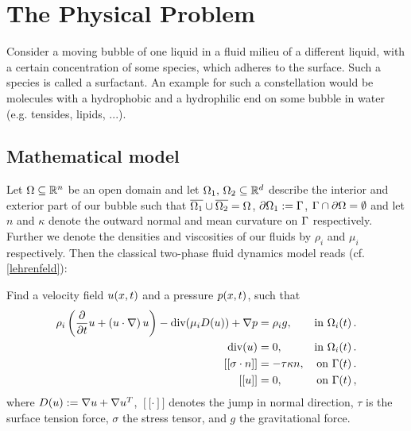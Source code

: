 \section{The Physical Problem}
Consider a moving bubble of one liquid in a fluid milieu of a different liquid, with a certain concentration of some species, which adheres to the surface. Such a species is called a surfactant. An example for such a constellation would be molecules with a hydrophobic and a hydrophilic end on some bubble in water (e.g. tensides, lipids, ...).

\subsection{Mathematical model}
Let $\Omega\subseteq\mathbb{R}^n$ be an open domain and let $\Omega_1,\,\Omega_2\subseteq\mathbb{R}^d$ describe the interior and exterior part of our bubble such that $\overline{\Omega_1}\cup\overline{\Omega_2}=\Omega$, $\partial\Omega_1:=\Gamma$, $\Gamma\cap\partial\Omega=\emptyset$ and let $n$ and $\kappa$ denote the outward normal and mean curvature on $\Gamma$ respectively.\\
Further we denote the densities and viscosities of our fluids by $\rho_i$ and $\mu_i$ respectively. 
Then the classical two-phase fluid dynamics model reads (cf. \ref{lehrenfeld}):\\
\begin{prob}
	Find a velocity field $u\!\left(x,t\right)$ and a pressure $p\!\left(x,t\right)$, such that
	\begin{subequations}
		\begin{align}
			\rho_i\left(\frac{\partial}{\partial t} u +\left(u\cdot\nabla\right) u\right) -\text{div}\!\left(\mu_iD\!\left(u\right)\right)+\nabla p&=\rho_ig,&\text{in }\Omega_i\!\left(t\right).\\
			\text{div}\!\left(u\right)&=0,&\text{in }\Omega_i\!\left(t\right).\\
			\left[[\sigma\cdot n\right]]&=-\tau\kappa n,&\text{on }\Gamma\!\left(t\right).\\
			\left[[u\right]]&=0,&\text{on }\Gamma\!\left(t\right),
		\end{align}
	\end{subequations}
	where $D\!\left(u\right):=\nabla u + \nabla u^T$, $\left[[\cdot\right]]$ denotes the jump in normal direction, $\tau$ is the surface tension force, $\sigma$ the stress tensor, and $g$ the gravitational force.
\end{prob}

